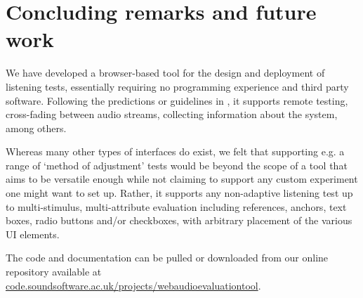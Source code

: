 \documentclass{sig-alternate}
\begin{document}
\section{Concluding remarks and future work}
\label{sec:conclusion}

	We have developed a browser-based tool for the design and deployment of listening tests, essentially requiring no programming experience and third party software. Following the predictions or guidelines in \cite{schoeffler2015mushra}, it supports remote testing, cross-fading between audio streams, collecting information about the system, among others. 

	Whereas many other types of interfaces do exist, we felt that supporting e.g. a range of `method of adjustment' tests would be beyond the scope of a tool that aims to be versatile enough while not claiming to support any custom experiment one might want to set up. Rather, it supports any non-adaptive listening test up to multi-stimulus, multi-attribute evaluation including references, anchors, text boxes, radio buttons and/or checkboxes, with arbitrary placement of the various UI elements. 
	
	The code and documentation can be pulled or downloaded from our online repository available at \url{code.soundsoftware.ac.uk/projects/webaudioevaluationtool}.

%

\small
%
%
\end{document}

